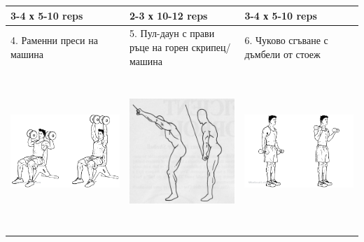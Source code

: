 \documentclass{article}
\begin{document}
\begin{tabular}{ | m{5cm} | m{5cm} | m{5cm} | }
3-4 х 5-10 reps &   2-3 х 10-12 reps &  3-4 х 5-10 reps \\
\hline
4. Раменни преси на машина & 
5. Пул-даун с прави ръце на горен скрипец/машина & 
6. Чуково сгъване с дъмбели от стоеж  \\ 
\begin{minipage}{5cm} \includegraphics[width=\linewidth, height=60mm]{day_B_ex_4_Dumbbell_Shoulder_Press.png} \end{minipage} &
\begin{minipage}{5cm} \includegraphics[width=\linewidth, height=60mm]{day_B_ex_5.jpg} \end{minipage} & 
\begin{minipage}{5cm} \includegraphics[width=\linewidth, height=60mm]{day_B_ex_6_standing_dumbbell_curl.png} \end{minipage} \\

\end{tabular}
\end{document}
